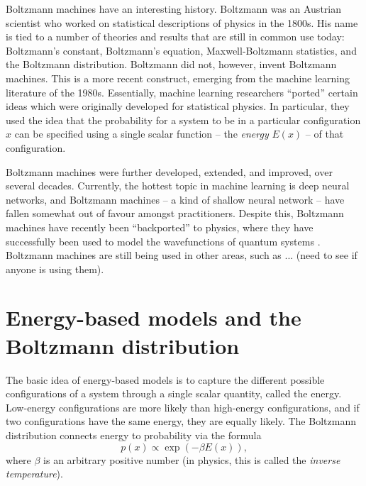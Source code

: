 \documentclass[a4paper]{article}
\begin{document}

Boltzmann machines have an interesting history. Boltzmann was an Austrian scientist who worked on statistical descriptions of physics in the 1800s. His name is tied to a number of theories and results that are still in common use today: Boltzmann's constant, Boltzmann's equation, Maxwell-Boltzmann statistics, and the Boltzmann distribution. Boltzmann did not, however, invent Boltzmann machines. This is a more recent construct, emerging from the machine learning literature of the 1980s. Essentially, machine learning researchers ``ported'' certain ideas which were originally developed for statistical physics. In particular, they used the idea that the probability for a system to be in a particular configuration $x$ can be specified using a single scalar function -- the \emph{energy} $E(x)$ -- of that configuration. 

Boltzmann machines were further developed, extended, and improved, over several decades. Currently, the hottest topic in machine learning is deep neural networks, and Boltzmann machines -- a kind of shallow neural network -- have fallen somewhat out of favour amongst practitioners. Despite this, Boltzmann machines have recently been ``backported'' to physics, where they have successfully been used to model the wavefunctions of quantum systems \cite{...}. Boltzmann machines are still being used in other areas, such as ... (need to see if anyone is using them).

\section{Energy-based models and the Boltzmann distribution}

The basic idea of energy-based models is to capture the different possible configurations of a system through a single scalar quantity, called the energy. Low-energy configurations are more likely than high-energy configurations, and if two configurations have the same energy, they are equally likely. The Boltzmann distribution connects energy to probability via the formula
\begin{equation}
 p(x) \propto \exp(-\beta E(x)),
\end{equation}
where $\beta$ is an arbitrary positive number (in physics, this is called the \emph{inverse temperature}). 
\end{document}
